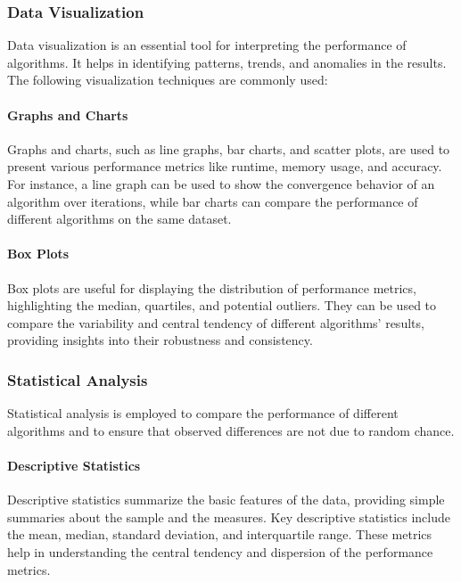 \documentclass[
]{article}
\begin{document}
    \subsubsection{Data Visualization}

    Data visualization is an essential tool for interpreting the performance of algorithms. It helps in identifying patterns, trends, and anomalies in the results. The following visualization techniques are commonly used:

    \paragraph{Graphs and Charts}

    Graphs and charts, such as line graphs, bar charts, and scatter plots, are used to present various performance metrics like runtime, memory usage, and accuracy. For instance, a line graph can be used to show the convergence behavior of an algorithm over iterations, while bar charts can compare the performance of different algorithms on the same dataset.

    \paragraph{Box Plots}

    Box plots are useful for displaying the distribution of performance metrics, highlighting the median, quartiles, and potential outliers. They can be used to compare the variability and central tendency of different algorithms' results, providing insights into their robustness and consistency.

    \subsubsection{Statistical Analysis}

    Statistical analysis is employed to compare the performance of different algorithms and to ensure that observed differences are not due to random chance.

    \paragraph{Descriptive Statistics}

    Descriptive statistics summarize the basic features of the data, providing simple summaries about the sample and the measures. Key descriptive statistics include the mean, median, standard deviation, and interquartile range. These metrics help in understanding the central tendency and dispersion of the performance metrics.
\end{document}
